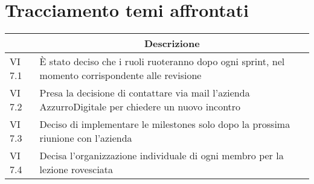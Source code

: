 \section{Tracciamento temi affrontati}

\begin{table}[htbp]
    \begin{tabular}{|p{}|p{}|}
        \hline
        \rowcolor[gray]{0.9}
        \multicolumn{1}{|c|}{\textbf{Codice}} & \multicolumn{1}{|c|}{\textbf{Descrizione}}\\
        \hline
        VI 7.1 & È stato deciso che i ruoli ruoteranno dopo ogni sprint, nel momento corrispondente alle revisione \\
        \hline
        VI 7.2 & Presa la decisione di contattare via mail l'azienda AzzurroDigitale per chiedere un nuovo incontro \\
        \hline
        VI 7.3 & Deciso di implementare le milestones solo dopo la prossima riunione con l'azienda \\
        \hline
        VI 7.4 & Decisa l'organizzazione individuale di ogni membro per la lezione rovesciata \\
        \hline
    \end{tabular}
    \end{table}